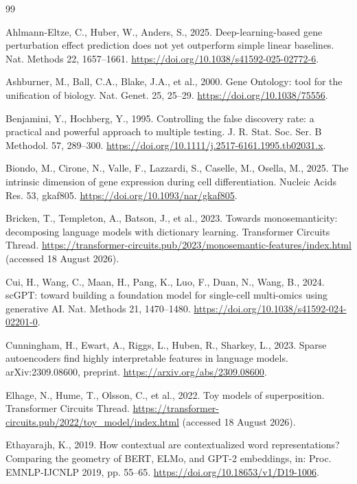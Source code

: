 \documentclass[review,authoryear,12pt]{elsarticle}
\begin{document}
\begin{thebibliography}{99}

 Ahlmann-Eltze, C., Huber, W., Anders, S., 2025. Deep-learning-based gene perturbation effect prediction does not yet outperform simple linear baselines. Nat. Methods 22, 1657--1661. \url{https://doi.org/10.1038/s41592-025-02772-6}.

 Ashburner, M., Ball, C.A., Blake, J.A., et al., 2000. Gene Ontology: tool for the unification of biology. Nat. Genet. 25, 25--29. \url{https://doi.org/10.1038/75556}.

 Benjamini, Y., Hochberg, Y., 1995. Controlling the false discovery rate: a practical and powerful approach to multiple testing. J. R. Stat. Soc. Ser. B Methodol. 57, 289--300. \url{https://doi.org/10.1111/j.2517-6161.1995.tb02031.x}.

 Biondo, M., Cirone, N., Valle, F., Lazzardi, S., Caselle, M., Osella, M., 2025. The intrinsic dimension of gene expression during cell differentiation. Nucleic Acids Res. 53, gkaf805. \url{https://doi.org/10.1093/nar/gkaf805}.

 Bricken, T., Templeton, A., Batson, J., et al., 2023. Towards monosemanticity: decomposing language models with dictionary learning. Transformer Circuits Thread. \url{https://transformer-circuits.pub/2023/monosemantic-features/index.html} (accessed 18 August 2026).

 Cui, H., Wang, C., Maan, H., Pang, K., Luo, F., Duan, N., Wang, B., 2024. scGPT: toward building a foundation model for single-cell multi-omics using generative AI. Nat. Methods 21, 1470--1480. \url{https://doi.org/10.1038/s41592-024-02201-0}.

 Cunningham, H., Ewart, A., Riggs, L., Huben, R., Sharkey, L., 2023. Sparse autoencoders find highly interpretable features in language models. arXiv:2309.08600, preprint. \url{https://arxiv.org/abs/2309.08600}.

 Elhage, N., Hume, T., Olsson, C., et al., 2022. Toy models of superposition. Transformer Circuits Thread. \url{https://transformer-circuits.pub/2022/toy_model/index.html} (accessed 18 August 2026).

 Ethayarajh, K., 2019. How contextual are contextualized word representations? Comparing the geometry of BERT, ELMo, and GPT-2 embeddings, in: Proc. EMNLP-IJCNLP 2019, pp. 55--65. \url{https://doi.org/10.18653/v1/D19-1006}.


\end{thebibliography}
\end{document}
